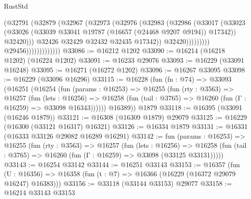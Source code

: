 \begin{lexlean}{RustStd}
\begin{coremodule}
                                        (@32791
                                          (@32879
                                            (@32967
                                              (@32973
                                                (@32976
                                                  (@32983
                                                    (@32986
                                                      (@33017
                                                        (@33023
                                                          (@33026
                                                            (@33039
                                                              @33041
                                                              @19787
                                                              (@16657 (@24468 @9207 @9194))
                                                              @17342))
                                                          @32420)))
                                                    @32426
                                                    @32429
                                                    @32432
                                                    @32435
                                                    @17342))
                                                @32420)))))))))
                              @29456)))))))))))))
@33086 := @16212 @1202
@33090 := @16214 (@16218 @1202) (@16224 @1202)
@33091 := @16233 @29076
@33093 := @16229 (@33091 @16248)
@33095 := @16271 (@16272 @1202)
@33096 := @16267 @33095
@33098 := @16229 (@33096 @16296)
@33115 := @16228
    (fun (fn : @74) =>
    @33093
      (@16251
        (@16254
          (fun (params : @16253) =>
          @16255
            (fun (rty : @3563) =>
            @16257
              (fun (lets : @16256) =>
              @16258 (fun (tail : @3765) => @16260 (fun (Γ : @16259) => @33098 @16343))))))
        @16389))
    @1879
@33118 := @16395 (@33091 (@16246 @1879))
@33121 := @16308 (@16309 @1879) @29079
@33125 := @16229 (@16300 (@33121 @16317) @16321)
@33126 := @16334 @1879
@33131 := @16331 (@16333 @33126 @29082 @16289 @16291)
@33142 := fun (params : @16253) =>
  @16255
    (fun (rty : @3563) =>
    @16257
      (fun (lets : @16256) =>
      @16258 (fun (tail : @3765) => @16260 (fun (Γ : @16259) => @33098 (@33125 @33131)))))
@33143 := @16254 @33142
@33144 := @16251 @33143
@33153 := @16357
    (fun (U : @16356) => @16358 (fun (t : @7) => @16366 (@16229 (@16372 @29079 @16247) @16383)))
@33156 := @33118 (@33144 @33153) @29077
@33158 := @16214 @33143 @33153

\end{coremodule}
\end{lexlean}
